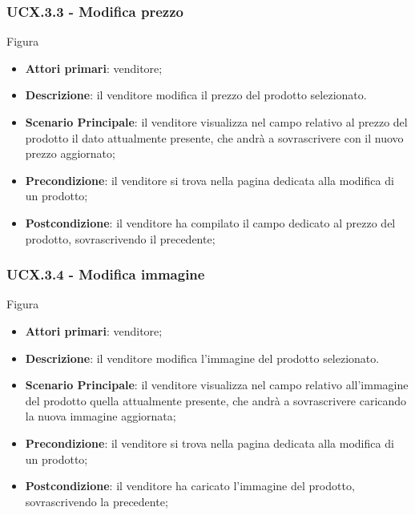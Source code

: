 \subsubsection{UCX.3.3 - Modifica prezzo}
Figura \\
\begin{itemize}
\item \textbf{Attori primari}: venditore;
\item \textbf{Descrizione}: il venditore modifica il prezzo del prodotto selezionato.
\item \textbf{Scenario Principale}: il venditore visualizza nel campo relativo al prezzo del prodotto il dato attualmente presente, che andrà a sovrascrivere con il nuovo prezzo aggiornato;
\item \textbf{Precondizione}: il venditore si trova nella pagina dedicata alla modifica di un prodotto;
\item \textbf{Postcondizione}: il venditore ha compilato il campo dedicato al prezzo del prodotto, sovrascrivendo il precedente;
\end{itemize}

\subsubsection{UCX.3.4 - Modifica immagine}
Figura \\
\begin{itemize}
\item \textbf{Attori primari}: venditore;
\item \textbf{Descrizione}: il venditore modifica l'immagine del prodotto selezionato.
\item \textbf{Scenario Principale}: il venditore visualizza nel campo relativo all'immagine del prodotto quella attualmente presente, che andrà a sovrascrivere caricando la nuova immagine aggiornata;
\item \textbf{Precondizione}: il venditore si trova nella pagina dedicata alla modifica di un prodotto;
\item \textbf{Postcondizione}: il venditore ha caricato l'immagine del prodotto, sovrascrivendo la precedente;
\end{itemize}

